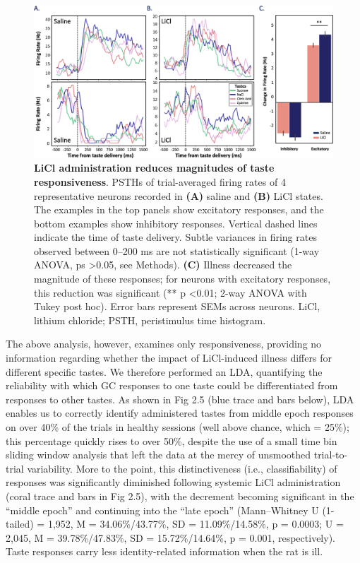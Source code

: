 \begin{refsection}
\begin{figure}
\includegraphics[width=\linewidth]{stone_2022_figs/journal.pbio.3001537.g004.png} 
\caption{\textbf{LiCl administration reduces magnitudes of taste responsiveness}. PSTHs of trial-averaged firing rates of 4 representative neurons recorded in \textbf{(A)} saline and \textbf{(B)} LiCl states. The examples in the top panels show excitatory responses, and the bottom examples show inhibitory responses. Vertical dashed lines indicate the time of taste delivery. Subtle variances in firing rates observed between 0–200 ms are not statistically significant (1-way ANOVA, ps \textgreater 0.05, see Methods). \textbf{(C)} Illness decreased the magnitude of these responses; for neurons with excitatory responses, this reduction was significant (** p \textless 0.01; 2-way ANOVA with Tukey post hoc). Error bars represent SEMs across neurons. LiCl, lithium chloride; PSTH, peristimulus time histogram.
}
\label{fig:wrapfig}
\end{figure}


The above analysis, however, examines only responsiveness, providing no information regarding whether the impact of LiCl-induced illness differs for different specific tastes. We therefore performed an LDA, quantifying the reliability with which GC responses to one taste could be differentiated from responses to other tastes. As shown in Fig 2.5 (blue trace and bars below), LDA enables us to correctly identify administered tastes from middle epoch responses on over 40\% of the trials in healthy sessions (well above chance, which = 25\%); this percentage quickly rises to over 50\%, despite the use of a small time bin sliding window analysis that left the data at the mercy of unsmoothed trial-to-trial variability. More to the point, this distinctiveness (i.e., classifiability) of responses was significantly diminished following systemic LiCl administration (coral trace and bars in Fig 2.5), with the decrement becoming significant in the “middle epoch” and continuing into the “late epoch” (Mann–Whitney U (1-tailed) = 1,952, M = 34.06\%/43.77\%, SD = 11.09\%/14.58\%, p = 0.0003; U = 2,045, M = 39.78\%/47.83\%, SD = 15.72\%/14.64\%, p = 0.001, respectively). Taste responses carry less identity-related information when the rat is ill.


\end{refsection}
